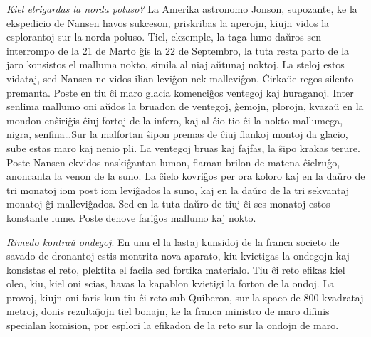 \emph{Kiel elrigardas la norda poluso?} La Amerika astronomo Jonson,
su\-po\-zan\-te, ke la ekspedicio de Nansen havos sukceson,
priskribas la aperojn, kiujn vidos la esplorantoj sur la norda
poluso. Tiel, ekzemple, la taga lumo da\u uros sen interrompo de la
21 de Marto \^gis la 22 de Septembro, la tuta resta parto de la jaro
konsistos el malluma nokto, simila al niaj a\u utunaj noktoj. La
steloj estos vidataj, sed Nansen ne vidos ilian levi\^gon nek
mallevi\^gon. \^Cirka\u ue regos silento premanta. Poste en tiu \^ci
maro glacia komenci\^gos ventegoj kaj huraganoj. Inter senlima
mallumo oni a\u udos la bruadon de ventegoj, \^gemojn, plorojn,
kvaza\u u en la mondon en\^siri\^gis \^ciuj fortoj de la infero, kaj
al \^cio tio \^ci la nokto mallumega, nigra, senfina\dots Sur la
malfortan \^sipon premas de \^ciuj flankoj montoj da glacio, sube
estas maro kaj nenio pli. La ventegoj bruas kaj fajfas, la \^sipo
krakas terure. Poste Nansen ekvidos naski\^gantan lumon, flaman
brilon de matena \^cielru\^go, anoncanta la venon de la suno. La
\^cielo kovri\^gos per ora koloro kaj en la da\u uro de tri monatoj
iom post iom levi\^gados la suno, kaj en la da\u uro de la tri
sekvantaj monatoj \^gi mallevi\^gados. Sed en la tuta da\u uro de
tiuj \^ci ses monatoj estos konstante lume. Poste denove fari\^gos
mallumo kaj nokto.

\emph{Rimedo kontra\u u ondegoj}. En unu el la lastaj kunsidoj de la
franca societo de savado de dronantoj estis montrita nova aparato,
kiu kvietigas la ondegojn kaj konsistas el reto, plektita el facila
sed fortika materialo. Tiu \^ci reto efikas kiel oleo, kiu, kiel oni
scias, havas la kapablon kvietigi la forton de la ondoj. La provoj,
kiujn oni faris kun tiu \^ci reto sub Quiberon, sur la spaco de 800
kvadrataj metroj, donis rezulta\^{\j}ojn tiel bonajn, ke la franca
ministro de maro difinis specialan komision, por esplori la efikadon
de la reto sur la ondojn de maro.

